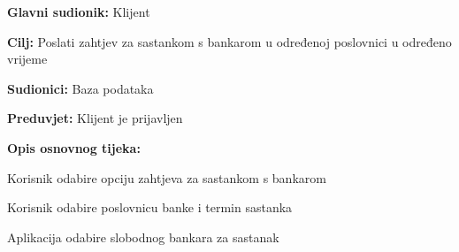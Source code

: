 			\noindent {}
			\begin{packed_item}
				
				\item \textbf{Glavni sudionik: }Klijent
				\item  \textbf{Cilj:} Poslati zahtjev za sastankom s bankarom u određenoj poslovnici u određeno vrijeme
				\item  \textbf{Sudionici:} Baza podataka
				\item  \textbf{Preduvjet:} Klijent je prijavljen
				\item  \textbf{Opis osnovnog tijeka:}
				
				\item[] \begin{packed_enum}
					
					\item Korisnik odabire opciju zahtjeva za sastankom s bankarom
					\item Korisnik odabire poslovnicu banke i termin sastanka
					\item Aplikacija odabire slobodnog bankara za sastanak 
					
					
					
					
				\end{packed_enum}
				
				
			\end{packed_item}
		
